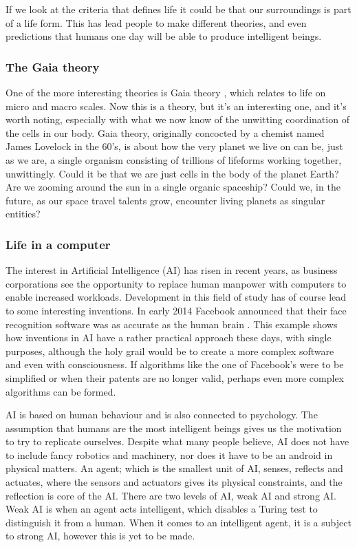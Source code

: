 If we look at the criteria that defines life it could be that our surroundings is part of a life form.
This has lead people to make different theories, and even predictions that humans one day will be able to produce intelligent beings.

\subsubsection*{The Gaia theory}
One of the more interesting theories is Gaia theory \cite{Lovelock}, which relates to life on micro and macro scales. Now this is a theory, but it's an interesting one, and it's worth noting, especially with what we now know of the unwitting coordination of the cells in our body.
Gaia theory, originally concocted by a chemist named James Lovelock in the 60's, is about how the very planet we live on can be, just as we are, a single organism consisting of trillions of lifeforms working together, unwittingly.
Could it be that we are just cells in the body of the planet Earth?
Are we zooming around the sun in a single organic spaceship?
Could we, in the future, as our space travel talents grow, encounter living planets as singular entities?


\subsubsection*{Life in a computer}
The interest in Artificial Intelligence (AI) has risen in recent years, as business corporations see the opportunity to replace human manpower with computers to enable increased workloads.
Development in this field of study has of course lead to some interesting inventions.
In early 2014 Facebook announced that their face recognition software was as accurate as the human brain \cite{facebook}.
This example shows how inventions in AI have a rather practical approach these days, with single purposes, although the holy grail would be to create a more complex software and even with consciousness.
If algorithms like the one of Facebook's were to be simplified or when their patents are no longer valid, perhaps even more complex algorithms can be formed.

AI is based on human behaviour and is also connected to psychology.
The assumption that humans are the most intelligent beings gives us the motivation to try to replicate ourselves.
Despite what many people believe, AI does not have to include fancy robotics and machinery, nor does it have to be an android in physical matters.
An agent; which is the smallest unit of AI, senses, reflects and actuates, where the sensors and actuators gives its physical constraints, and the reflection is core of the AI.
There are two levels of AI, weak AI and strong AI. Weak AI is when an agent acts intelligent, which disables a Turing test to distinguish it from a human.
When it comes to an intelligent agent, it is a subject to strong AI, however this is yet to be made.
